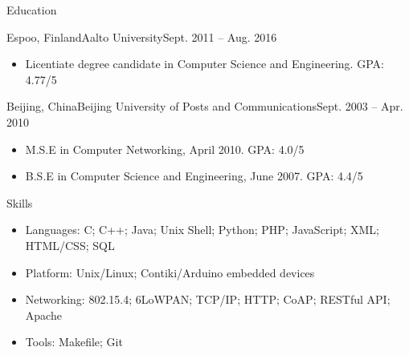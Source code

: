 \documentclass[print]{mcdowellcv}
\begin{document}
	\begin{cvsection}{Education}
		\begin{cvsubsection}{Espoo, Finland}{Aalto University}{Sept. 2011 -- Aug. 2016}
			\begin{itemize}
				\item Licentiate degree candidate in Computer Science and Engineering. GPA: 4.77/5
			\end{itemize}
		\end{cvsubsection}

		\begin{cvsubsection}[2]{Beijing, China}{Beijing University of Posts and Communications}{Sept. 2003 --  Apr. 2010}
			\begin{itemize}
				\item M.S.E in Computer Networking, April 2010. GPA: 4.0/5				 
				\item B.S.E in Computer Science and Engineering, June 2007. GPA: 4.4/5
			\end{itemize}
		\end{cvsubsection}
	\end{cvsection}
	
	\begin{cvsection}{Skills}
		\begin{cvsubsection}{}{}{}	
			\begin{itemize}
				\item Languages: C; C++; Java; Unix Shell; Python; PHP; JavaScript; XML; HTML/CSS; SQL
				\item Platform: Unix/Linux; Contiki/Arduino embedded devices
				\item Networking: 802.15.4; 6LoWPAN; TCP/IP; HTTP; CoAP; RESTful API; Apache
				\item Tools: Makefile; Git
			\end{itemize}
		\end{cvsubsection}
	\end{cvsection}
\end{document}
